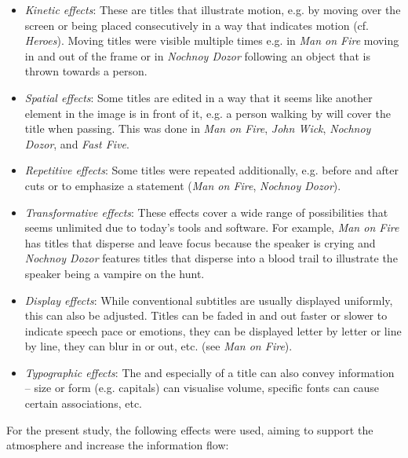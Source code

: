 \sloppy
\begin{itemize}
\item \textit{Kinetic effects}: These are titles that illustrate motion, e.g. by moving over the screen or being placed consecutively in a way that indicates motion (cf. \textit{Heroes}). Moving titles were visible multiple times e.g. in \textit{Man on Fire} moving in and out of the frame or in \textit{Nochnoy Dozor} following an object that is thrown towards a person.
\item \textit{Spatial effects}: Some titles are edited in a way that it seems like another element in the image is in front of it, e.g. a person walking by will cover the title when passing. This was done in \textit{Man on Fire}, \textit{John Wick}, \textit{Nochnoy Dozor}, and \textit{Fast Five}.
\item \textit{Repetitive effects}: Some titles were repeated additionally, e.g. before and after cuts or to emphasize a statement (\textit{Man on Fire}, \textit{Nochnoy Dozor}).
\item \textit{Transformative effects}: These effects cover a wide range of possibilities that seems unlimited due to today’s tools and software. For example, \textit{Man on Fire} has titles that disperse and leave focus because the speaker is crying and \textit{Nochnoy Dozor} features titles that disperse into a blood trail to illustrate the speaker being a vampire on the hunt.
\item \textit{Display effects}: While conventional subtitles are usually displayed uniformly, this can also be adjusted. Titles can be faded in and out faster or slower to indicate speech pace or emotions, they can be displayed letter by letter or line by line, they can blur in or out, etc. (see \textit{Man on Fire}).
\item \textit{Typographic effects}: The  and especially  of a title can also convey information –  size or form (e.g. capitals) can visualise volume, specific fonts can cause certain associations, etc.
\end{itemize}
\fussy

For the present study, the following effects were used, aiming to support the atmosphere and increase the information flow:

